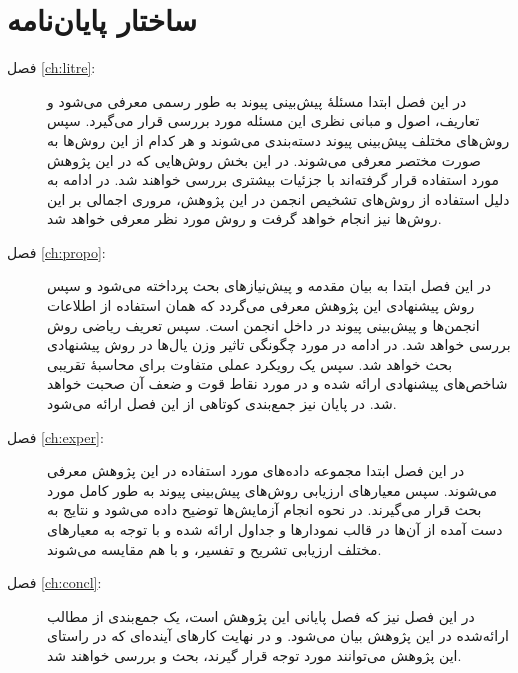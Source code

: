 \section{ساختار پایان‌نامه}

\begin{description}
  \item[فصل \ref{ch:litre}:] در این فصل ابتدا مسئلهٔ پیش‌بینی پیوند به طور رسمی معرفی می‌شود و تعاریف، اصول و مبانی نظری این مسئله مورد بررسی قرار می‌گیرد. سپس روش‌های مختلف پیش‌بینی پیوند دسته‌بندی می‌شوند و هر کدام از این روش‌ها به صورت مختصر معرفی می‌شوند. در این بخش روش‌هایی که در این پژوهش مورد استفاده قرار گرفته‌اند با جزئیات بیشتری بررسی خواهند شد. در ادامه به دلیل استفاده از روش‌های تشخیص انجمن در این پژوهش، مروری اجمالی بر این روش‌ها نیز انجام خواهد گرفت و روش مورد نظر معرفی خواهد شد.
  
  \item[فصل \ref{ch:propo}:] در این فصل ابتدا به بیان مقدمه و پیش‌نیازهای بحث پرداخته می‌شود و سپس روش پیشنهادی این پژوهش معرفی می‌گردد که همان استفاده از اطلاعات انجمن‌ها و پیش‌بینی پیوند در داخل انجمن است. سپس تعریف ریاضی روش بررسی خواهد شد. در ادامه در مورد چگونگی تاثیر وزن یال‌ها در روش پیشنهادی بحث خواهد شد. سپس یک رویکرد عملی متفاوت برای محاسبهٔ تقریبی شاخص‌های پیشنهادی ارائه شده و در مورد نقاط قوت و ضعف آن صحبت خواهد شد. در پایان نیز جمع‌بندی کوتاهی از این فصل ارائه می‌شود.
  
  \item[فصل \ref{ch:exper}:] در این فصل ابتدا مجموعه داده‌های مورد استفاده در این پژوهش معرفی می‌شوند. سپس معیارهای ارزیابی روش‌های پیش‌بینی پیوند به طور کامل مورد بحث قرار می‌گیرند. در نحوه انجام آزمایش‌ها توضیح داده می‌شود و نتایج به دست آمده از آن‌ها در قالب نمودارها و جداول ارائه شده و با توجه به معیارهای مختلف ارزیابی تشریح و تفسیر، و با هم مقایسه می‌شوند.
  
  \item[فصل \ref{ch:concl}:] در این فصل نیز که فصل پایانی این پژوهش است، یک جمع‌بندی از مطالب ارائه‌شده در این پژوهش بیان می‌شود. و در نهایت کارهای آینده‌ای که در راستای این پژوهش می‌توانند مورد توجه قرار گیرند، بحث و بررسی خواهند شد.
  
  
\end{description}
